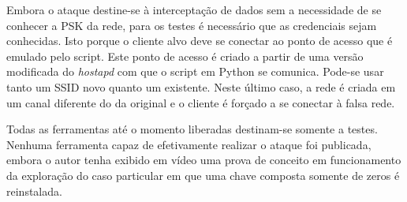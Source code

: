 \documentclass[12pt]{article}
\begin{document}
Embora o ataque destine-se à interceptação de dados sem a necessidade de se conhecer a PSK da rede, para os testes é necessário que as credenciais sejam conhecidas. Isto porque o cliente alvo deve se conectar ao ponto de acesso que é emulado pelo script. Este ponto de acesso é criado a partir de uma versão modificada do \textit{hostapd} com que o script em Python se comunica. Pode-se usar tanto um SSID novo quanto um existente. Neste último caso, a rede é criada em um canal diferente do da original e o cliente é forçado a se conectar à falsa rede.

Todas as ferramentas até o momento liberadas destinam-se somente a testes. Nenhuma ferramenta capaz de efetivamente realizar o ataque foi publicada, embora o autor tenha exibido em vídeo uma prova de conceito em funcionamento da exploração do caso particular em que uma chave composta somente de zeros é reinstalada.




     
\end{document}
